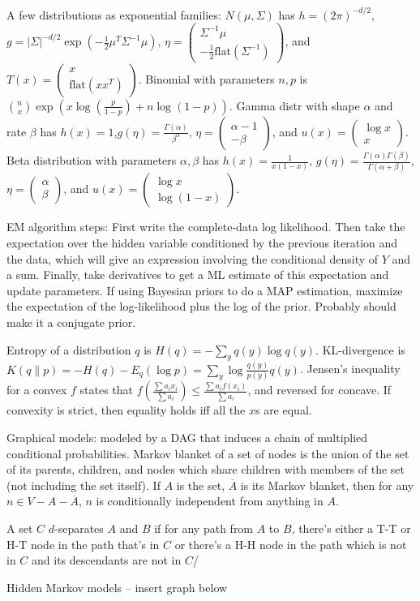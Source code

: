 \documentclass{article}
\newcommand{\conj}{\overline}
\newcommand{\openm}{\begin{pmatrix}}
\newcommand{\closem}{\end{pmatrix}}
\begin{document}
A few distributions as exponential families: $N(\mu,\Sigma)$ has $h=(2\pi)^{-d/2}$, $g=|\Sigma|^{-d/2}\exp(-\frac{1}{2}\mu^T\Sigma^{-1}\mu)$, $\eta=\openm\Sigma^{-1}\mu\\-\frac{1}{2}\text{flat}(\Sigma^{-1})\closem$, and $T(x)=\openm x\\\text{flat}(xx^T)\closem$. Binomial with parameters $n,p$ is $\binom{n}{x}\exp\left(x\log\left(\frac{p}{1-p}\right)+n\log(1-p)\right)$. Gamma distr with shape $\alpha$ and rate $\beta$ has $h(x)=1$,$g(\eta)=\frac{\Gamma(\alpha)}{\beta^\alpha}$, $\eta=\openm\alpha-1\\-\beta\closem$, and $u(x)=\openm\log x\\x\closem$. Beta distribution with parameters $\alpha,\beta$ has $h(x)=\frac{1}{x(1-x)}$, $g(\eta)=\frac{\Gamma(\alpha)\Gamma(\beta)}{\Gamma(\alpha+\beta)}$, $\eta=\openm\alpha\\\beta\closem$, and $u(x)=\openm\log x\\\log(1-x)\closem$.

EM algorithm steps: First write the complete-data log likelihood. Then take the expectation over the hidden variable conditioned by the previous iteration and the data, which will give an expression involving the conditional density of $Y$ and a sum. Finally, take derivatives to get a ML estimate of this expectation and update parameters. If using Bayesian priors to do a MAP estimation, maximize the expectation of the log-likelihood plus the log of the prior. Probably should make it a conjugate prior.

Entropy of a distribution $q$ is $H(q)=-\sum_yq(y)\log q(y)$. KL-divergence is $K(q\|p)=-H(q)-E_q(\log p)=\sum_y\log\frac{q(y)}{p(y)}q(y)$. Jensen's inequality for a convex $f$ states that $f\left(\frac{\sum a_ix_i}{\sum a_i}\right)\leq\frac{\sum a_if(x_i)}{\sum a_i}$, and reversed for concave. If convexity is strict, then equality holds iff all the $x$s are equal.

Graphical models: modeled by a DAG that induces a chain of multiplied conditional probabilities. Markov blanket of a set of nodes is the union of the set of its parents, children, and nodes which share children with members of the set (not including the set itself). If $A$ is the set, $\conj{A}$ is its Markov blanket, then for any $n\in V-A-\conj{A}$, $n$ is conditionally independent from anything in $A$.

A set $C$ $d$-separates $A$ and $B$ if for any path from $A$ to $B$, there's either a T-T or H-T node in the path that's in $C$ or there's a H-H node in the path which is not in $C$ and its descendants are not in $C$/

Hidden Markov models -- insert graph below
\end{document}
